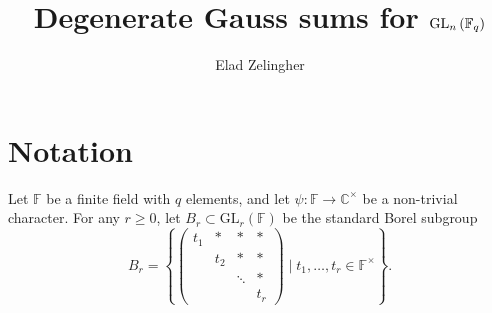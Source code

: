\documentclass[12pt, reqno]{amsart}
\title{Degenerate Gauss sums for $\GL_n\left(\finiteField_q\right)$}
\author{Elad Zelingher}
\theoremstyle{definition}
\theoremstyle{definition}
\theoremstyle{definition}
\newcommand{\cComplex}{\mathbb{C}}
\newcommand{\multiplicativegroup}[1]{#1^{\times}}
\newcommand{\fieldCharacter}{\psi}
\newcommand{\GL}{\mathrm{GL}}
\newcommand{\finiteField}{\mathbb{F}}
\begin{document}
\begin{abstract}
\end{abstract}
\maketitle

\section{Notation}
Let $\finiteField$ be a finite field with $q$ elements, and let $\fieldCharacter \colon \finiteField \to \multiplicativegroup{\cComplex}$ be a non-trivial character. For any $r \ge 0$, let $B_r \subset \GL_r\left(\finiteField\right)$ be the standard Borel subgroup
$$B_r = \left\{ \begin{pmatrix}
	t_1 & \ast & \ast & \ast\\
	& t_2 & \ast & \ast \\
	& & \ddots & \ast\\
	& & & t_r
\end{pmatrix} \mid t_1,\dots,t_r \in \multiplicativegroup{\finiteField} \right\}.$$
\end{document}
